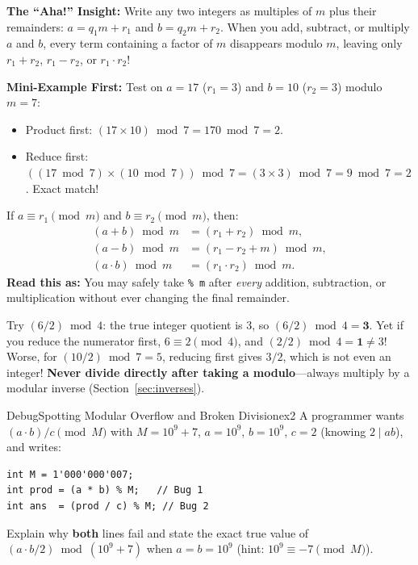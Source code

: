 \documentclass[11pt,a4paper]{article}
\theoremstyle{definition}
\newcommand{\ahabeat}{\textbf{\color{accentteal}The ``Aha!'' Insight:} }
\newcommand{\examplebeat}{\textbf{\color{primaryblue}Mini-Example First:} }
\begin{document}
\ahabeat Write any two integers as multiples of $m$ plus their remainders: $a = q_1 m + r_1$ and $b = q_2 m + r_2$. When you add, subtract, or multiply $a$ and $b$, every term containing a factor of $m$ disappears modulo $m$, leaving only $r_1 + r_2$, $r_1 - r_2$, or $r_1 \cdot r_2$!

\examplebeat Test on $a = 17$ ($r_1 = 3$) and $b = 10$ ($r_2 = 3$) modulo $m = 7$:
\begin{itemize}
    \item Product first: $(17 \times 10) \bmod 7 = 170 \bmod 7 = 2$.
    \item Reduce first: $((17 \bmod 7) \times (10 \bmod 7)) \bmod 7 = (3 \times 3) \bmod 7 = 9 \bmod 7 = 2$. Exact match!
\end{itemize}

\begin{formulabox}
If $a \equiv r_1 \pmod m$ and $b \equiv r_2 \pmod m$, then:
\[
\begin{aligned}
    (a + b) \bmod m &= (r_1 + r_2) \bmod m, \\
    (a - b) \bmod m &= (r_1 - r_2 + m) \bmod m, \\
    (a \cdot b) \bmod m &= (r_1 \cdot r_2) \bmod m.
\end{aligned}
\]
\textbf{Read this as:} You may safely take \texttt{\% m} after \emph{every} addition, subtraction, or multiplication without ever changing the final remainder.
\end{formulabox}

\begin{watchoutbox}
Try $(6 / 2) \bmod 4$: the true integer quotient is $3$, so $(6 / 2) \bmod 4 = \mathbf{3}$. Yet if you reduce the numerator first, $6 \equiv 2 \pmod 4$, and $(2 / 2) \bmod 4 = \mathbf{1} \neq 3$! Worse, for $(10 / 2) \bmod 7 = 5$, reducing first gives $3 / 2$, which is not even an integer! \textbf{Never divide directly after taking a modulo}---always multiply by a modular inverse (Section~\ref{sec:inverses}).
\end{watchoutbox}

\begin{tryitbox}{Debug}{Spotting Modular Overflow and Broken Division}{ex2}
A programmer wants $(a \cdot b) / c \pmod M$ with $M = 10^9 + 7$, $a = 10^9$, $b = 10^9$, $c = 2$ (knowing $2 \mid ab$), and writes:
\begin{lstlisting}[numbers=none, xleftmargin=4pt, framexleftmargin=4pt]
int M = 1'000'000'007;
int prod = (a * b) % M;   // Bug 1
int ans  = (prod / c) % M; // Bug 2
\end{lstlisting}
Explain why \textbf{both} lines fail and state the exact true value of $(a \cdot b / 2) \bmod (10^9 + 7)$ when $a = b = 10^9$ (hint: $10^9 \equiv -7 \pmod M$).
\end{tryitbox}
\end{document}
